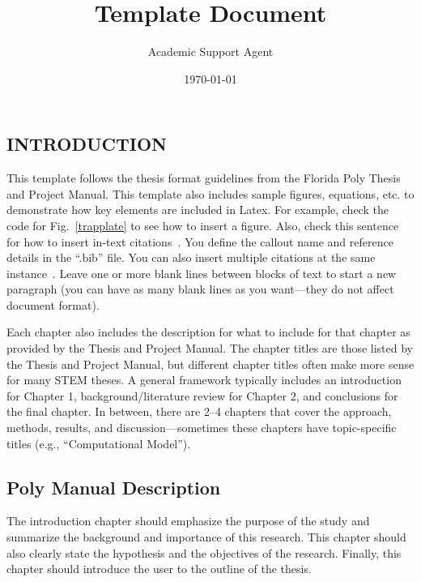 \documentclass{article}
\title{Template Document}
\author{Academic Support Agent}
\date{\today}
\begin{document}
\maketitle

\makefrontmatter


\begin{body}





\chapter{INTRODUCTION}
This template follows the thesis format guidelines from the Florida Poly Thesis and Project Manual. This template also includes sample figures, equations, etc. to demonstrate how key elements are included in Latex. For example, check the code for Fig.~\ref{trapplate} to see how to insert a figure. Also, check this sentence for how to insert in-text citations~\cite{Kelley2017JIMSS}. You define the callout name and reference details in the ``.bib'' file. You can also insert multiple citations at the same instance~\cite{Kelley2017JIMSS,Kelley2019Scitech,Preumont2006M,IEEEstandard,Kauffman2012PhD}. Leave one or more blank lines between blocks of text to start a new paragraph (you can have as many blank lines as you want---they do not affect document format). 

Each chapter also includes the description for what to include for that chapter as provided by the Thesis and Project Manual. The chapter titles are those listed by the Thesis and Project Manual, but different chapter titles often make more sense for many STEM theses. A general framework typically includes an introduction for Chapter 1, background/literature review for Chapter 2, and conclusions for the final chapter. In between, there are 2--4 chapters that cover the approach, methods, results, and discussion---sometimes these chapters have topic-specific titles (e.g., ``Computational Model'').  



\section{Poly Manual Description}
The introduction chapter should emphasize the purpose of the study and summarize the background and importance of this research. This chapter should also clearly state the hypothesis and the objectives of the research. Finally, this chapter should introduce the user to the outline of the thesis.





\end{body}
\end{document}

